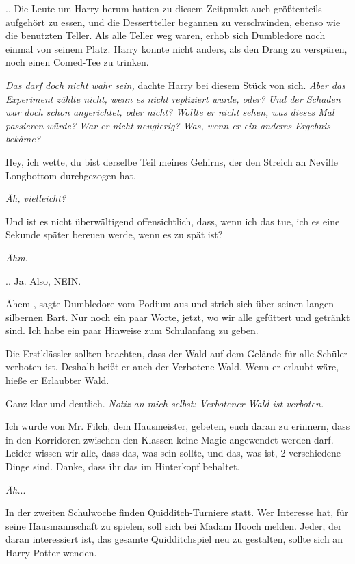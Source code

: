 .. Die Leute um Harry herum hatten zu diesem Zeitpunkt auch größtenteils
aufgehört zu essen, und die Dessertteller begannen zu verschwinden, ebenso wie
die benutzten Teller. Als alle Teller weg waren, erhob sich Dumbledore noch
einmal von seinem Platz. Harry konnte nicht anders, als den Drang zu verspüren,
noch einen Comed-Tee zu trinken.

\emph{Das darf doch nicht wahr sein,} dachte Harry bei diesem Stück von sich.
\emph{Aber das Experiment zählte nicht, wenn es nicht repliziert wurde, oder?
Und der Schaden war doch schon angerichtet, oder nicht? Wollte er nicht sehen,
was dieses Mal passieren würde? War er nicht neugierig? Was, wenn er ein anderes
Ergebnis bekäme?}

Hey, ich wette, du bist derselbe Teil meines Gehirns, der den Streich an Neville
Longbottom durchgezogen hat.

\emph{Äh, vielleicht?}

Und ist es nicht überwältigend offensichtlich, dass, wenn ich das tue, ich es
eine Sekunde später bereuen werde, wenn es zu spät ist?

\emph{Ähm}.

.. Ja. Also, NEIN. \glqq

Ähem\grqq{} , sagte Dumbledore vom Podium aus und strich sich über seinen langen
silbernen Bart. \glqq Nur noch ein paar Worte, jetzt, wo wir alle gefüttert und
getränkt sind. Ich habe ein paar Hinweise zum Schulanfang zu geben.\grqq{}

\glqq Die Erstklässler sollten beachten, dass der Wald auf dem Gelände für alle
Schüler verboten ist. Deshalb heißt er auch der Verbotene Wald. Wenn er erlaubt
wäre, hieße er Erlaubter Wald.\grqq{}

Ganz klar und deutlich.
\emph{ Notiz an mich selbst: Verbotener Wald ist verboten.}

\glqq Ich wurde von Mr. Filch, dem Hausmeister, gebeten, euch daran zu erinnern,
dass in den Korridoren zwischen den Klassen keine Magie angewendet werden darf.
Leider wissen wir alle, dass das, was sein sollte, und das, was ist, 2
verschiedene Dinge sind. Danke, dass ihr das im Hinterkopf behaltet.\grqq{}

\emph{ Äh.}..

\glqq In der zweiten Schulwoche finden Quidditch-Turniere statt. Wer Interesse
hat, für seine Hausmannschaft zu spielen, soll sich bei Madam Hooch melden.
Jeder, der daran interessiert ist, das gesamte Quidditchspiel neu zu gestalten,
sollte sich an Harry Potter wenden.\grqq{}

